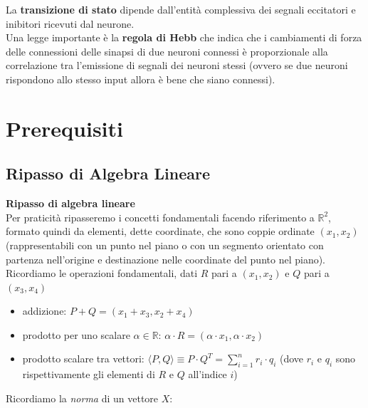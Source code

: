 La \textbf{transizione di stato} dipende dall'entità complessiva dei segnali
eccitatori e inibitori ricevuti dal neurone.\\
Una legge importante è la \textbf{regola di Hebb} che indica che i cambiamenti
di forza delle connessioni delle sinapsi di due neuroni connessi è proporzionale
alla correlazione tra l'emissione di segnali dei neuroni stessi (ovvero se due
neuroni rispondono allo stesso input allora è bene che siano connessi).
\section{Prerequisiti}
	   \subsection{Ripasso di Algebra Lineare}
									      			      		\begin{shaded}
									      			      			\textbf{Ripasso di algebra lineare}\\
									      			      			Per praticità ripasseremo i concetti fondamentali facendo riferimento a
									      			      			$\mathbb{R}^2$, formato quindi da elementi, dette coordinate, che sono coppie
									      			      			ordinate $(x_1, x_2)$ (rappresentabili con un punto nel piano o con un segmento
									      			      			orientato con partenza nell'origine e destinazione nelle coordinate del punto
									      			      			nel piano).\\
									      			      			Ricordiamo le operazioni fondamentali, dati $R$ pari a $(x_1, x_2)$ e $Q$ pari
									      			      			a $(x_3, x_4)$ 
									      			      			\begin{itemize}
									      			      				\item addizione: $P+Q=(x_1+x_3, x_2+x_4)$
									      			      				\item prodotto per uno scalare $\alpha\in\mathbb{R}$: $\alpha\cdot
									      			      				      R=(\alpha\cdot x_1,\alpha\cdot x_2)$
									      			      				\item prodotto scalare tra vettori: $\langle P, Q\rangle\equiv P\cdot Q^T =
									      			      				      \sum_{i=1}^n r_i\cdot q_i$ 
									      			      				      (dove $r_i$ e $q_i$ sono rispettivamente gli elementi di $R$ e $Q$
									      			      				      all'indice $i$)
									      			      			\end{itemize}
									      			      			Ricordiamo la \textit{norma} di un vettore $X$:

\end{shaded}
